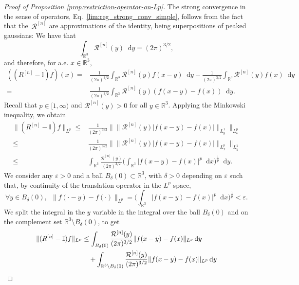 \documentclass[12pt,a4paper]{amsart}
\numberwithin{equation}{section}
\newcommand*\diff{\mathop{}\!\mathrm{d}}
\begin{document}
\begin{proof}[Proof of Proposition \ref{prop:restriction-operator-on-Lp}]
		The strong convergence in the sense of operators, Eq.~\eqref{lim:reg_strong_conv_simple}, follows from the fact that the~$\mathcal{R}^{[n]}$ are approximations of the identity, being superpositions of peaked gaussians: We have that
		\begin{equation*}
			\int_{\mathbb{R}^3} \mathcal{R}^{[n]}(y) \diff  y = (2 \pi)^{3/2} , 
		\end{equation*}
		and therefore, for a.e. $x\in\mathbb{R}^3$,
		\begin{align*}
			((R^{[n]}-\mathbb{I})f)(x) = & \frac{1}{(2 \pi)^{3/2} } \int_{\mathbb{R}^3}  \mathcal{R}^{[n]}(y) f(x-y)\diff  y - \frac{1}{(2 \pi)^{3/2} } \int_{\mathbb{R}^3} \mathcal{R}^{[n]}(y) f(x) \diff  y  \\
			= & \frac{1}{(2 \pi)^{3/2} } \int_{\mathbb{R}^3}  \mathcal{R}^{[n]}(y) (f(x-y)-f(x)) \diff  y.
		\end{align*}
		Recall that $ p \in [1,\infty) $ and $ \mathcal{R}^{[n]}(y) >0 $ for all $y\in\mathbb{R}^3$. Applying the Minkowski inequality, we obtain
		\begin{align*}
			\| (R^{[n]}-\mathbb{I})f \|_{L^p} \leq & \frac{1}{(2 \pi)^{3/2} } \big\| \| \mathcal{R}^{[n]}(y) |f(x-y)-f(x)| \|_{L^1_y} \big\|_{L^p_x}  \\
			\leq & \frac{1}{(2 \pi)^{3/2} } \big\| \| \mathcal{R}^{[n]}(y) |f(x-y)-f(x)| \|_{L^p_x} \big\|_{L^1_y}  \\
			\leq & \int_{\mathbb{R}^3}  \frac{\mathcal{R}^{[n]}(y)}{(2 \pi)^{3/2} } \Big( \int_{\mathbb{R}^3} |f(x-y) -f(x) |^p \diff x \Big)^{\frac{1}{p}} \diff y .
		\end{align*}
		We consider any $ \varepsilon >0 $ and a ball $ B_\delta(0)\subset\mathbb{R}^3$, with $\delta >0$ depending on $\varepsilon$ such that, by continuity of the translation operator in the $L^p$ space,
		\begin{equation*}
			\forall y \in B_\delta(0), \;\ \| f(\cdot-y)-f(\cdot) \|_{L^p} = \Big( \int_{\mathbb{R}^3} |f(x-y) -f(x) |^p \diff x \Big)^{\frac{1}{p}} < \varepsilon .
		\end{equation*}
		We split the integral in the $y$ variable in the integral over the ball $ B_\delta(0)$ and on the complement set $ \mathbb{R}^3\setminus B_\delta(0) $, to get
		\begin{align}
			\| (R^{[n]}-\mathbb{I})f \|_{L^p} &\leq   \int_{B_\delta(0)}  \frac{\mathcal{R}^{[n]}(y)}{(2 \pi)^{3/2} } \| f(x-y)-f(x) \|_{L^p} \diff y \notag \\
			& \quad + \int_{\mathbb{R}^3\setminus B_\delta(0)}  \frac{\mathcal{R}^{[n]}(y)}{(2 \pi)^{3/2} } \| f(x-y) - f(x) \|_{L^p} \diff y \notag \\

\end{align}
\end{proof}
\end{document}
